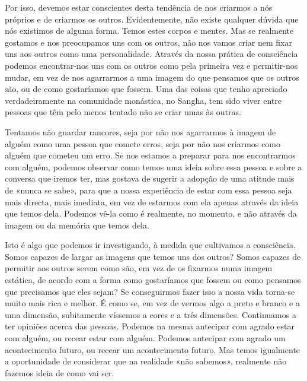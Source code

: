 Por isso, devemos estar conscientes desta tendência de nos criarmos a
nós próprios e de criarmos os outros. Evidentemente, não existe qualquer
dúvida que nós existimos de alguma forma. Temos estes corpos e mentes.
Mas se realmente gostamos e nos preocupamos uns com os outros, não nos
vamos criar nem fixar uns aos outros como uma personalidade. Através da
nossa prática de consciência podemos encontrar-nos uns com os outros
como pela primeira vez e permitir-nos mudar, em vez de nos agarrarmos a
uma imagem do que pensamos que os outros são, ou de como gostaríamos que
fossem. Uma das coisas que tenho apreciado verdadeiramente na comunidade
monástica, no Sangha, tem sido viver entre pessoas que têm pelo menos
tentado não se criar umas às outras.

Tentamos não guardar rancores, seja por não nos agarrarmos à imagem de
alguém como uma pessoa que comete erros, seja por não nos criarmos como
alguém que cometeu um erro. Se nos estamos a preparar para nos
encontrarmos com alguém, podemos observar como temos uma ideia sobre
essa pessoa e sobre a conversa que iremos ter, mas gostava de sugerir a
adopção de uma atitude mais de «nunca se sabe», para que a nossa
experiência de estar com essa pessoa seja mais directa, mais imediata,
em vez de estarmos com ela apenas através da ideia que temos dela.
Podemos vê-la como é realmente, no momento, e não através da imagem ou
da memória que temos dela.

Isto é algo que podemos ir investigando, à medida que cultivamos a
consciência. Somos capazes de largar as imagens que temos uns dos
outros? Somos capazes de permitir aos outros serem como são, em vez de
os fixarmos numa imagem estática, de acordo com a forma como gostaríamos
que fossem ou como pensamos que precisamos que eles sejam? Se
conseguirmos fazer isso a nossa vida torna-se muito mais rica e melhor.
É como se, em vez de vermos algo a preto e branco e a uma dimensão,
subitamente víssemos a cores e a três dimensões. Continuamos a ter
opiniões acerca das pessoas. Podemos na mesma antecipar com agrado estar
com alguém, ou recear estar com alguém. Podemos antecipar com agrado um
acontecimento futuro, ou recear um acontecimento futuro. Mas temos
igualmente a oportunidade de considerar que na realidade «não sabemos»,
realmente não fazemos ideia de como vai ser.

